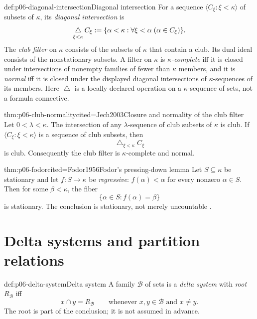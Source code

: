 \begin{hbdefinition}{def:p06-diagonal-intersection}{Diagonal intersection}
For a sequence \(\langle C_\xi:\xi<\kappa\rangle\) of subsets of \(\kappa\),
its \emph{diagonal intersection} is
\[
  \mathop{\triangle}_{\xi<\kappa}C_\xi
  \mathrel{:=}
  \{\alpha<\kappa:\forall\xi<\alpha\;(\alpha\in C_\xi)\}.
\]
The \emph{club filter} on \(\kappa\) consists of the subsets of \(\kappa\)
that contain a club.  Its dual ideal consists of the nonstationary subsets.
A filter on \(\kappa\) is \emph{\(\kappa\)-complete} iff it is closed under
intersections of nonempty families of fewer than \(\kappa\) members, and it is
\emph{normal} iff it is closed under the displayed diagonal intersections of
\(\kappa\)-sequences of its members.
Here \(\mathop{\triangle}\) is a locally declared operation on a
\(\kappa\)-sequence of sets, not a formula connective.
\end{hbdefinition}

\begin{hbtheorem}{thm:p06-club-normality}{cited=Jech2003}{Closure and normality of the club filter}
Let \(0<\lambda<\kappa\).  The intersection of any
\(\lambda\)-sequence of club subsets of \(\kappa\) is club.  If
\(\langle C_\xi:\xi<\kappa\rangle\) is a sequence of club subsets, then
\[
  \mathop{\triangle}_{\xi<\kappa}C_\xi
\]
is club.  Consequently the club filter is \(\kappa\)-complete and normal.
\end{hbtheorem}

\begin{hbtheorem}{thm:p06-fodor}{cited=Fodor1956}{Fodor's pressing-down lemma}
Let \(S\subseteq\kappa\) be stationary and let \(f:S\to\kappa\) be
\emph{regressive}: \(f(\alpha)<\alpha\) for every nonzero
\(\alpha\in S\).  Then for some \(\beta<\kappa\), the fiber
\[
  \{\alpha\in S:f(\alpha)=\beta\}
\]
is stationary.  The conclusion is stationary, not merely uncountable
\cite{Fodor1956}.
\end{hbtheorem}

\section{Delta systems and partition relations}
\label{sec:p06-delta-ramsey}

\begin{hbdefinition}{def:p06-delta-system}{Delta system}
A family \(\mathcal B\) of sets is a \emph{delta system} with
\emph{root} \(R_{\mathcal B}\) iff
\[
  x\cap y=R_{\mathcal B}
  \qquad
  \text{whenever }x,y\in\mathcal B\text{ and }x\ne y.
\]
The root is part of the conclusion; it is not assumed in advance.
\end{hbdefinition}

